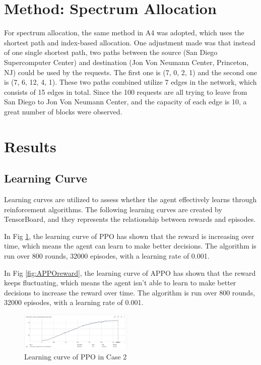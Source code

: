 \documentclass[conference]{IEEEtran}
\begin{document}
\section{Method: Spectrum Allocation}
For spectrum allocation, the same method in A4 was adopted, which uses the shortest path and index-based allocation. One adjustment made was that instead of one single shortest path, two paths between the source (San Diego Supercomputer Center) and destination (Jon Von Neumann Center, Princeton, NJ) could be used by the requests. The first one is (7, 0, 2, 1) and the second one is (7, 6, 12, 4, 1). These two paths combined utilize 7 edges in the network, which consists of 15 edges in total. Since the 100 requests are all trying to leave from San Diego to Jon Von Neumann Center, and the capacity of each edge is 10, a great number of blocks were observed. 

\section{Results}
\subsection{Learning Curve}
Learning curves are utilized to assess whether the agent effectively learns through reinforcement algorithms. The following learning curves are created by TensorBoard, and they represents the relationship between rewards and episodes. 

In Fig \ref{fig:LcPPO}, the learning curve of PPO has shown that the reward is increasing over time, which means the agent can learn to make better decisions. The algorithm is run over 800 rounds, 32000 episodes, with a learning rate of 0.001.


In Fig \ref{fig:APPOreward}, the learning curve of APPO has shown that the reward keeps fluctuating, which means the agent isn't able to learn to make better decisions to increase the reward over time. The algorithm is run over 800 rounds, 32000 episodes, with a learning rate of 0.001.

\begin{figure}[h]
    \includegraphics[width=0.48\textwidth]{learning_curve_PPO.png}
    \caption{Learning curve of PPO in Case 2}
    \label{fig:LcPPO}
\end{figure}
\end{document}
